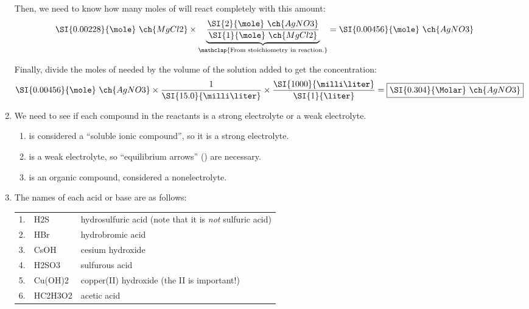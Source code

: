 \documentclass[11pt,letterpaper]{article}
\begin{document}
\begin{enumerate}[itemsep=2em,leftmargin=0pt,label=\textbf{\Alph*.}]
		Then, we need to know how many moles of  will react
		completely with this amount:
		\begin{align*}
			\SI{0.00228}{\mole}~\ch{MgCl2} \times
			\underbrace{\frac{\SI{2}{\mole}~\ch{AgNO3}}{\SI{1}{\mole}~\ch{MgCl2}}}_{\mathclap{\text{From
			stoichiometry in reaction.}}}
			&= \SI{0.00456}{\mole}~\ch{AgNO3}
		\end{align*}

		Finally, divide the moles of  needed by the volume of
		the  solution added to get the concentration:
		\begin{align*}
			\SI{0.00456}{\mole}~\ch{AgNO3} \times
			\frac{1}{\SI{15.0}{\milli\liter}} \times
			\frac{\SI{1000}{\milli\liter}}{\SI{1}{\liter}} &=
			\boxed{\SI{0.304}{\Molar}~\ch{AgNO3}}
		\end{align*}

	\item We need to see if each compound in the reactants is a strong
		electrolyte or a weak electrolyte.
		\begin{enumerate}[label={\arabic*.},itemsep=2em]
			\item {}

				 is considered a ``soluble ionic
				compound'', so it is a strong electrolyte.
			\item {}

				 is a weak electrolyte, so ``equilibrium
				arrows'' (\ch{<=>}) are necessary.
			\item {}

				 is an organic compound, considered a
				nonelectrolyte.
		\end{enumerate}
	\item The names of each acid or base are as follows:

		\begin{tabular} {r E l}
			1. & H2S & hydrosulfuric acid (note that it is
			\emph{not} sulfuric acid) \\
			2. & HBr & hydrobromic acid \\
			3. & CsOH & cesium hydroxide \\
			4. & H2SO3 & sulfurous acid \\
			5. & Cu(OH)2 & copper(II) hydroxide (the II is
			important!) \\
			6. & HC2H3O2 & acetic acid
		\end{tabular}


\end{enumerate}
\end{document}
